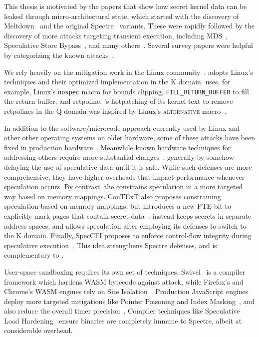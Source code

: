 \label{s:related}

This thesis is motivated by the papers that show how secret kernel data
can be leaked through micro-architectural state, which started with the discovery of Meltdown~\cite{lipp:meltdown} and the original Spectre~\cite{kocher:spectre} variants.
These were rapidly followed by the discovery of more attacks targeting transient execution, including MDS~\cite{canella:fallout,schwarz:zombieload,schaik:ridl}, Speculative Store Bypass~\cite{horn:speculative-store-bypass}, and many others~\cite{bhattacharyya:smotherspectre,bulck:foreshadow,chen:sgxspectre,koruyeh:spectrersb,ragab:crosstalk,stecklina:lazyfp,schaik:cacheout,weisse:foreshadow-ng, bulck:lvi}.
Several survey papers were helpful by categorizing the known attacks~\cite{hill:survey,sok:transient,xiong:survey}.

We rely heavily on the mitigation work in the Linux
community~\cite{linux:vuln}. \sys adopts Linux's techniques and their
optimized implementation in the K domain.  \sys uses, for example,
Linux's \texttt{nospec} macro for bounds clipping,
\texttt{FILL\_RETURN\_BUFFER} to fill the return buffer, and retpoline.
\sys's hotpatching of its kernel text to remove retpolines in the Q
domain was inspired by Linux's \textsc{alternative}
macro~\cite{lwn:alternative}.

In addition to the software/microcode approach currently used by Linux and other other operating systems on older hardware, some of these attacks have been fixed in production hardware~\cite{intel:affected-processors}.
Meanwhile known hardware techniques for addressing others require more substantial changes~\cite{barber:specshield, weisse:nda, ainsworth:muontrap,yu:stt,yu:sdo}, generally by somehow delaying the use of speculative data until it is safe.
While such defenses are
more comprehensive, they have higher overheads that impact performance whenever
speculation occurs. By contrast, the \contract constrains speculation in a more
targeted way based on memory mappings. ConTExT also proposes constraining
speculation based on memory mappings, but introduces a new PTE bit to explicitly
mark pages that contain secret data~\cite{ConTExT}. \sys instead keeps secrets in
separate address spaces, and allows speculation after employing its defenses to
switch to the K domain.  Finally, SpecCFI proposes to enforce control-flow
integrity during speculative execution~\cite{koruyeh:speccfi}. This idea strengthens
Spectre defenses, and is complementary to \sys.

User-space sandboxing requires its own set of techniques.
Swivel~\cite{narayan:swivel} is a compiler framework which hardens WASM bytecode against attack, while
Firefox's and Chrome's WASM engines rely on Site Isolation~\cite{reis:site-isolation}.
Production JavaScript engines deploy more targeted mitigations like Pointer Poisoning and Index Masking~\cite{webkit:spectre-meltdown}, and also reduce the overall timer precision~\cite{mozilla:timer-precision, webkit:spectre-meltdown}.
Compiler techniques like Speculative Load Hardening~\cite{carruth:slh} ensure binaries are completely immune to Spectre, albeit at considerable overhead.

